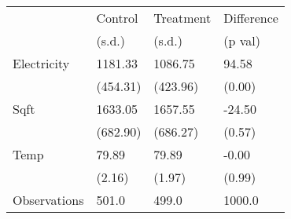 \begin{tabular}{llll}
\toprule
{} &   Control & Treatment & Difference \\
{} &    (s.d.) &    (s.d.) &    (p val) \\
\midrule
Electricity  &   1181.33 &   1086.75 &      94.58 \\
             &  (454.31) &  (423.96) &     (0.00) \\
Sqft         &   1633.05 &   1657.55 &     -24.50 \\
             &  (682.90) &  (686.27) &     (0.57) \\
Temp         &     79.89 &     79.89 &      -0.00 \\
             &    (2.16) &    (1.97) &     (0.99) \\
Observations &     501.0 &     499.0 &     1000.0 \\
\bottomrule
\end{tabular}
